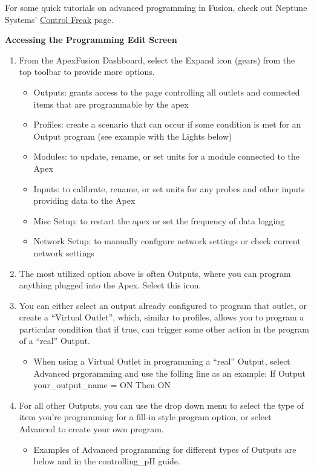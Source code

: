 \documentclass[
]{book}
\providecommand{\tightlist}{%
  \setlength{\itemsep}{0pt}\setlength{\parskip}{0pt}}
\begin{document}
For some quick tutorials on advanced programming in Fusion, check out Neptune Systems' \href{https://www.neptunesystems.com/getstarted/apexng/apex-control-freak-advanced/}{Control Freak} page.

\textbf{Accessing the Programming Edit Screen}

\begin{enumerate}
\def\labelenumi{\arabic{enumi}.}
\tightlist
\item
  From the ApexFusion Dashboard, select the Expand icon (gears) from the top toolbar to provide more options.

  \begin{itemize}
  \tightlist
  \item
    Outputs: grants access to the page controlling all outlets and connected items that are programmable by the apex
  \item
    Profiles: create a scenario that can occur if some condition is met for an Output program (see example with the Lights below)
  \item
    Modules: to update, rename, or set units for a module connected to the Apex
  \item
    Inputs: to calibrate, rename, or set units for any probes and other inputs providing data to the Apex
  \item
    Misc Setup: to restart the apex or set the frequency of data logging
  \item
    Network Setup: to manually configure network settings or check current network settings
  \end{itemize}
\item
  The most utilized option above is often Outputs, where you can program anything plugged into the Apex. Select this icon.
\item
  You can either select an output already configured to program that outlet, or create a ``Virtual Outlet'', which, similar to profiles, allows you to program a particular condition that if true, can trigger some other action in the program of a ``real'' Output.

  \begin{itemize}
  \tightlist
  \item
    When using a Virtual Outlet in programming a ``real'' Output, select Advanced prgoramming and use the folling line as an example: If Output your\_output\_name = ON Then ON
  \end{itemize}
\item
  For all other Outputs, you can use the drop down menu to select the type of item you're programming for a fill-in style program option, or select Advanced to create your own program.

  \begin{itemize}
  \tightlist
  \item
    Examples of Advanced programming for different types of Outputs are below and in the controlling\_pH guide.
  \end{itemize}
\end{enumerate}
\end{document}
